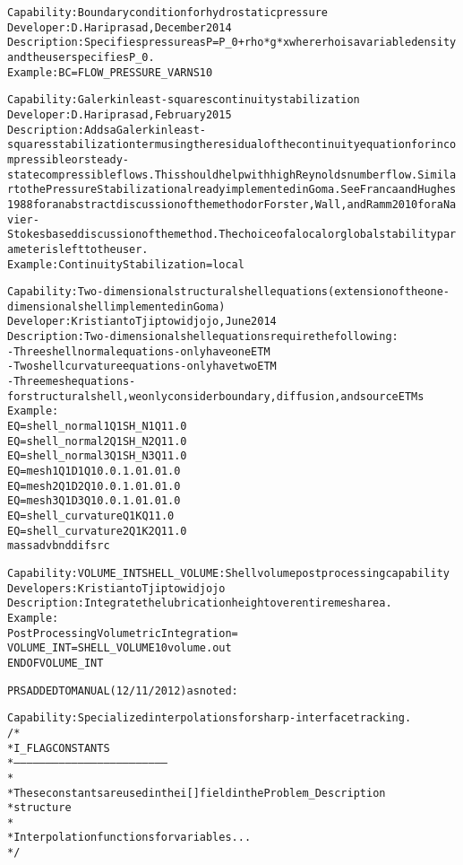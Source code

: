 \documentclass{article}
\begin{document}
\begin{alltt}
Capability: Boundary condition for hydrostatic pressure
Developer: D. Hariprasad, December 2014
Description: Specifies pressure as P = P_0 + rho*g*x where rho is a variable density and the user specifies P_0.
Example:  BC = FLOW_PRESSURE_VAR NS 1 0

Capability: Galerkin least-squares continuity stabilization 
Developer: D. Hariprasad, February 2015
Description: Adds a Galerkin least-squares stabilization term using the residual of the continuity equation for incompressible or steady-state compressible flows.  This should help with high Reynolds number flow.  Similar to the Pressure Stabilization already implemented in Goma.  See Franca and Hughes 1988 for an abstract discussion of the method or Forster, Wall, and Ramm 2010 for a Navier-Stokes based discussion of the method.  The choice of a local or global stability parameter is left to the user.
Example: Continuity Stabilization = local


Capability:  Two-dimensional structural shell equations (extension of the one-dimensional shell implemented in Goma)
Developer: Kristianto Tjiptowidjojo, June 2014
Description:  Two-dimensional shell equations require the following: 
             - Three shell normal equations - only have one ETM
             - Two shell curvature equations - only have two ETM
             - Three mesh equations - for structural shell, we only consider boundary, diffusion, and source ETMs 
Example: 
EQ = shell_normal1    Q1  SH_N1 Q1                1.0
EQ = shell_normal2    Q1  SH_N2 Q1                1.0
EQ = shell_normal3    Q1  SH_N3 Q1                1.0
EQ = mesh1            Q1  D1    Q1  0.   0.  1.0  1.0  1.0
EQ = mesh2            Q1  D2    Q1  0.   0.  1.0  1.0  1.0
EQ = mesh3            Q1  D3    Q1  0.   0.  1.0  1.0  1.0
EQ = shell_curvature  Q1  K     Q1                1.0
EQ = shell_curvature2 Q1  K2    Q1                1.0
                                    mass adv bnd  dif  src

Capability: VOLUME_INT SHELL_VOLUME: Shell volume post processing capability 
Developers: Kristianto Tjiptowidjojo
Description:  Integrate the lubrication height over entire mesh area.  
Example: 
Post Processing Volumetric Integration =
VOLUME_INT = SHELL_VOLUME 1 0 volume.out
END OF VOLUME_INT


PRS ADDED TO MANUAL (12/11/2012) as noted:

Capability:  Specialized interpolations for sharp-interface tracking. 
/*
 * I_FLAG CONSTANTS
 * ------------------------------------------------------------------------
 *
 * These constants are used in the i[] field in the Problem_Description
 * structure
 *
 * Interpolation functions for variables...
 */


\end{alltt}
\end{document}
